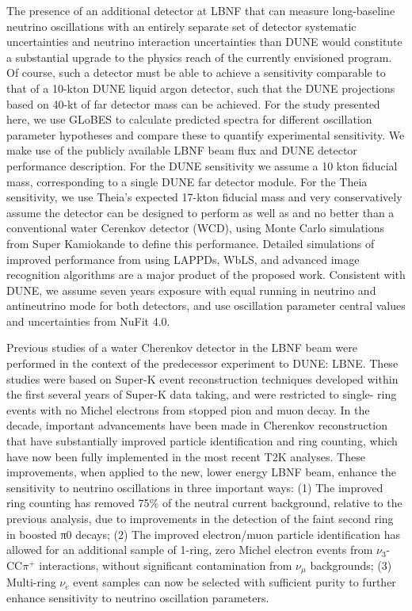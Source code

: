 The presence of an additional detector at LBNF that can measure long-baseline neutrino oscillations with an
entirely separate set of detector systematic uncertainties and neutrino interaction uncertainties than
DUNE would constitute a substantial upgrade to the physics reach of the currently envisioned program.
Of course, such a detector must be able to achieve a sensitivity comparable to that of a 10-kton DUNE liquid
argon detector, such that the DUNE projections\cite{DUNECDR} based on 40-kt of far detector mass can be achieved.
For the study presented here, we use GLoBES\cite{globes} to calculate predicted spectra for different
oscillation parameter hypotheses and compare these to quantify experimental sensitivity. We make use of
the publicly available LBNF beam flux and DUNE detector performance description\cite{DUNE_configs}. For the DUNE
sensitivity we assume a 10 kton fiducial mass, corresponding to a single DUNE far detector module. For the
Theia sensitivity, we use Theia’s expected 17-kton fiducial mass and very conservatively assume the detector
can be designed to perform as well as and no better than a conventional water Cerenkov detector (WCD), using
Monte Carlo simulations from Super Kamiokande to define this performance. Detailed simulations of improved
performance from using LAPPDs, WbLS, and advanced image recognition algorithms are a major product of the
proposed work. Consistent with DUNE, we assume seven years exposure with equal running in neutrino and
antineutrino mode for both detectors, and use oscillation parameter central values and uncertainties
from NuFit 4.0\cite{nufit4}.

Previous studies of a water Cherenkov detector in the LBNF beam were performed in the context of the
predecessor experiment to DUNE: LBNE\cite{lbne}. These studies were based on Super-K event reconstruction techniques
developed within the first several years of Super-K data taking, and were restricted to single- ring events with
no Michel electrons from stopped pion and muon decay. In the decade, important advancements have been made in
Cherenkov reconstruction that have substantially improved particle identification and ring counting, which have
now been fully implemented in the most recent T2K analyses\cite{t2k}. These improvements, when applied to the
new, lower energy LBNF beam, enhance the sensitivity to neutrino oscillations in three important ways: (1)
The improved ring counting has removed 75\% of the neutral current background, relative to the previous analysis,
due to improvements in the detection of the faint second ring in boosted π0 decays; (2) The improved electron/muon
particle identification has allowed for an additional sample of 1-ring, zero Michel electron events
from $\nu_{3}$-CC$\pi^{+}$ interactions, without significant contamination from $\nu_{\mu}$ backgrounds; (3)
Multi-ring $\nu_{e}$ event samples can now be selected with sufficient purity to further enhance sensitivity to
neutrino oscillation parameters.

